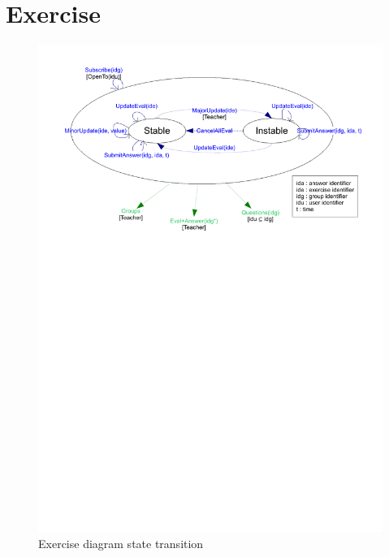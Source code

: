 \section{Exercise}
	\begin{figure}[ht]
			\begin{center}
				\includegraphics[width=\textwidth,  trim=2cm 18cm 2cm 1cm]{UML_figure/state_transition/dojo_logic/st_exercise.pdf}
				\caption{Exercise diagram state transition}
			\end{center}
	\end{figure}